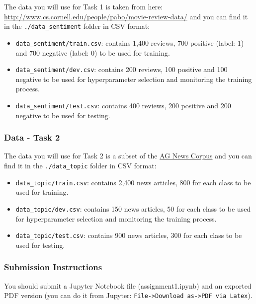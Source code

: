 \documentclass[11pt]{article}
\providecommand{\tightlist}{%
      \setlength{\itemsep}{0pt}\setlength{\parskip}{0pt}}
\begin{document}
The data you will use for Task 1 is taken from here:
\url{http://www.cs.cornell.edu/people/pabo/movie-review-data/} and you
can find it in the \texttt{./data\_sentiment} folder in CSV format:

\begin{itemize}
\tightlist
\item
  \texttt{data\_sentiment/train.csv}: contains 1,400 reviews, 700
  positive (label: 1) and 700 negative (label: 0) to be used for
  training.
\item
  \texttt{data\_sentiment/dev.csv}: contains 200 reviews, 100 positive
  and 100 negative to be used for hyperparameter selection and
  monitoring the training process.
\item
  \texttt{data\_sentiment/test.csv}: contains 400 reviews, 200 positive
  and 200 negative to be used for testing.
\end{itemize}

\hypertarget{data---task-2}{%
\subsubsection{Data - Task 2}\label{data---task-2}}

The data you will use for Task 2 is a subset of the
\href{http://groups.di.unipi.it/~gulli/AG_corpus_of_news_articles.html}{AG
News Corpus} and you can find it in the \texttt{./data\_topic} folder in
CSV format:

\begin{itemize}
\tightlist
\item
  \texttt{data\_topic/train.csv}: contains 2,400 news articles, 800 for
  each class to be used for training.
\item
  \texttt{data\_topic/dev.csv}: contains 150 news articles, 50 for each
  class to be used for hyperparameter selection and monitoring the
  training process.
\item
  \texttt{data\_topic/test.csv}: contains 900 news articles, 300 for
  each class to be used for testing.
\end{itemize}

\hypertarget{submission-instructions}{%
\subsubsection{Submission Instructions}\label{submission-instructions}}

You should submit a Jupyter Notebook file (assignment1.ipynb) and an
exported PDF version (you can do it from Jupyter:
\texttt{File-\textgreater{}Download\ as-\textgreater{}PDF\ via\ Latex}).
\end{document}
